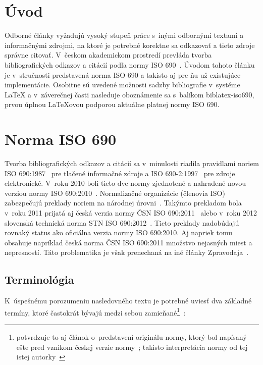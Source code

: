 \documentclass{csbulletin}
\begin{document}
\begin{refsection}

\section{Úvod}

Odborné články vyžadujú vysoký stupeň práce s~inými odbornými textami
a informačnými zdrojmi, na ktoré je potrebné korektne sa odkazovať a
tieto zdroje správne citovať. V~českom akademickom prostredí prevláda
tvorba bibliografických odkazov a citácií podľa normy
ISO 690~\cite{Kratochvil2011}. Úvodom tohoto článku je v~stručnosti
predstavená norma ISO 690 a takisto aj pre ňu už existujúce
implementácie. Osobitne sú uvedené možnosti sadzby bibliografie
v~systéme \LaTeX{} a v~záverečnej časti nasleduje oboznámenie sa
s~balíkom \textsf{biblatex-iso690}, prvou úplnou \LaTeX{}ovou
podporou aktuálne platnej normy ISO 690.


\section{Norma ISO 690}

Tvorba bibliografických odkazov a citácií sa v~minulosti riadila
pravidlami noriem ISO 690:1987~\cite{iso690:1987} pre tlačené
informačné zdroje a ISO 690-2:1997~\cite{iso690:2:1997} pre zdroje
elektronické. V~roku 2010 boli tieto dve normy zjednotené a nahradené
novou verziou normy ISO 690:2010~\cite{iso690:2010}. Normalizačné
organizácie (členovia ISO) zabezpečujú preklady noriem na národnej
úrovni~\cite{isoMembershipManual}. Takýmto prekladom bola v~roku 2011
prijatá aj česká verzia normy ČSN ISO 690:2011~\cite{csn:iso690:2011}
alebo v~roku 2012 slovenská technická norma
STN ISO 690:2012~\cite{stn:iso690:2012}. Tieto preklady nadobúdajú
rovnaký status ako oficiálna verzia normy ISO 690:2010. Aj napriek
tomu obsahuje napríklad česká norma ČSN ISO 690:2011 množstvo
nejasných miest a nepresností. Táto problematika je však prenechaná
na iné články Zpravodaja~\cite{Hala2013}.

\subsection{Terminológia}

K~úspešnému porozumeniu nasledovného textu je potrebné uviesť dva
základné termíny, ktoré častokrát bývajú medzi sebou
zamieňané\footnote{potvrdzuje to aj článok o~predstavení originálu
normy, ktorý bol napísaný ešte pred vznikom českej verzie
normy~\cite{Bratkova2010}; takisto interpretácia normy od tej istej
autorky~\cite{Bratkova2011}}~\cite{csn:iso690:2011}:


\end{refsection}
\end{document}

